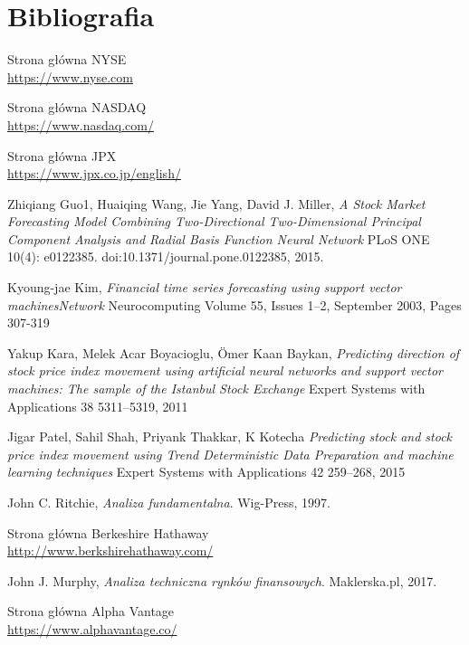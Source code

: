 \documentclass[a4paper, twoside, 11pt, openright]{article}
\begin{document}
\section{Bibliografia}


\begin{thebibliography}{9}
  
Strona główna NYSE
\\\url{https://www.nyse.com}
 
Strona główna NASDAQ
\\\url{https://www.nasdaq.com/}

Strona główna JPX
\\\url{https://www.jpx.co.jp/english/}

Zhiqiang Guo1, Huaiqing Wang, Jie Yang, David J. Miller,
\textit{A Stock Market Forecasting Model Combining Two-Directional Two-Dimensional Principal Component Analysis and Radial Basis Function Neural Network}
PLoS ONE 10(4): e0122385. doi:10.1371/journal.pone.0122385, 2015.


Kyoung-jae Kim,
\textit{Financial time series forecasting using support vector machinesNetwork}
Neurocomputing Volume 55, Issues 1–2, September 2003, Pages 307-319


Yakup Kara, Melek Acar Boyacioglu, Ömer Kaan Baykan,
\textit{Predicting direction of stock price index movement using artificial neural
networks and support vector machines: The sample of the Istanbul Stock Exchange}
Expert Systems with Applications 38 5311–5319, 2011

Jigar Patel, Sahil Shah, Priyank Thakkar, K Kotecha
\textit{Predicting stock and stock price index movement using Trend
Deterministic Data Preparation and machine learning techniques}
Expert Systems with Applications 42 259–268, 2015

  John C. Ritchie,
  \textit{Analiza fundamentalna}.
  Wig-Press,
  1997.
  
Strona główna Berkeshire Hathaway
\\\url{http://www.berkshirehathaway.com/}

  John J. Murphy,
  \textit{Analiza techniczna rynków finansowych}.
  Maklerska.pl,
  2017.

Strona główna Alpha Vantage
\\\url{https://www.alphavantage.co/}


\end{thebibliography}
\end{document}
